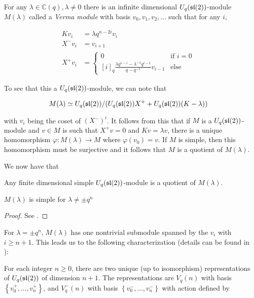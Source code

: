 For any $\lambda \in \mathbb{C}(q), \lambda \neq 0$ there is an infinite
dimensional $U_q(\mathfrak{sl}(2))$-module $M(\lambda)$ called a \emph{Verma module}
with basis $v_0, v_1, v_2, \ldots$ such that for any $i$,

\begin{align}
    Kv_i &= \lambda q^{n-2i}v_i \\
    X^-v_i &= v_{i+1} \\
     X^+ v_i &= \begin{cases} 0 & \text{if $i = 0$} \\
                          [i]_q \frac{\lambda q^{1-i} - \lambda^{-1}q^{i-1}}{q - q^{-1}}v_{i-1} & \text{else}
            \end{cases}
\end{align}

To see that this a $U_q(\mathfrak{sl}(2))$-module, we can note that 

\begin{equation}
    M(\lambda) \simeq U_q(\mathfrak{sl}(2))/(U_q(\mathfrak{sl}(2)) X^+  + U_q(\mathfrak{sl}(2))(K-\lambda))
\end{equation}

with $v_i$ being the coset of $(X^-)^i$. It follows from this that if $M$ is a
$U_q(\mathfrak{sl}(2))$-module and $v \in M$ is such that $X^+ v = 0$ and $Kv = \lambda v$, there
is a unique homomorphism $\varphi: M(\lambda) \to M$ where $\varphi(v_0) = v$.
If $M$ is simple, then this homomorphism must be  surjective and it follows
that $M$ is a quotient of $M(\lambda)$. 

We now have that 
\begin{claim}
    Any finite dimensional simple $U_q(\mathfrak{sl}(2))$-module is a quotient of $M(\lambda)$.
\end{claim}

\begin{claim}
    $M(\lambda)$ is simple for $\lambda \neq \pm q^n$
\end{claim}

\begin{proof}
    See \cite{Jantzen1995}.
\end{proof}

For $\lambda = \pm q^{n}$, $M(\lambda)$ has one nontrivial submodule spanned by the $v_i$ with $i \geq n+1$.
This leads us to the following characterization (details can be found in \cite{Jantzen1995}):


For each integer $n \geq 0$, there are two unique (up to isomorphism)
representations of $U_q(\mathfrak{sl}(2))$ of dimension $n+1$. 
The representations are $V_q(n)$ with basis $\left\{ v^+_0, \ldots, v^+_n
\right\}$, and $V_q^-(n)$ with basis $\left\{ v^-_0, \ldots, v^-_n \right\}$
with action defined by 

